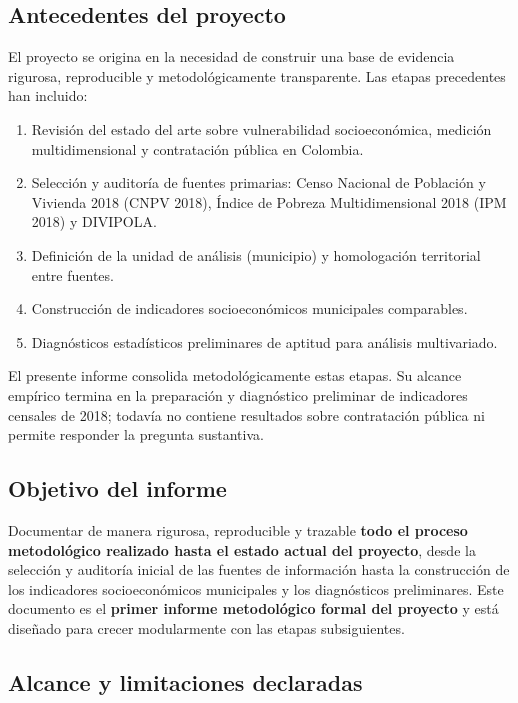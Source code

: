\subsection{Antecedentes del proyecto}

El proyecto se origina en la necesidad de construir una base de evidencia rigurosa, reproducible y metodológicamente transparente. Las etapas precedentes han incluido:

\begin{enumerate}
    \item Revisión del estado del arte sobre vulnerabilidad socioeconómica, medición multidimensional y contratación pública en Colombia.
    \item Selección y auditoría de fuentes primarias: Censo Nacional de Población y Vivienda 2018 (CNPV 2018), Índice de Pobreza Multidimensional 2018 (IPM 2018) y DIVIPOLA.
    \item Definición de la unidad de análisis (municipio) y homologación territorial entre fuentes.
    \item Construcción de indicadores socioeconómicos municipales comparables.
    \item Diagnósticos estadísticos preliminares de aptitud para análisis multivariado.
\end{enumerate}

El presente informe consolida metodológicamente estas etapas. Su alcance empírico termina en la preparación y diagnóstico preliminar de indicadores censales de 2018; todavía no contiene resultados sobre contratación pública ni permite responder la pregunta sustantiva.

\subsection{Objetivo del informe}

Documentar de manera rigurosa, reproducible y trazable \textbf{todo el proceso metodológico realizado hasta el estado actual del proyecto}, desde la selección y auditoría inicial de las fuentes de información hasta la construcción de los indicadores socioeconómicos municipales y los diagnósticos preliminares. Este documento es el \textbf{primer informe metodológico formal del proyecto} y está diseñado para crecer modularmente con las etapas subsiguientes.

\subsection{Alcance y limitaciones declaradas}

